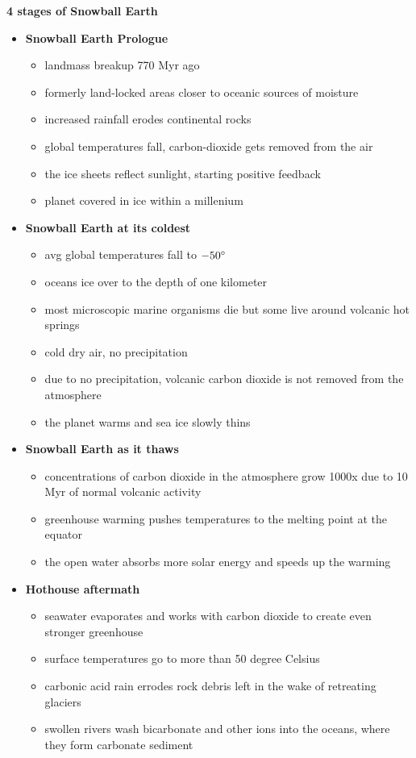 \textbf{4 stages of Snowball Earth}
\begin{itemize}
    \item \textbf{Snowball Earth Prologue}
    \begin{itemize}
    	\item landmass breakup 770 Myr ago
	\item formerly land-locked areas closer to oceanic sources of moisture
	\item increased rainfall erodes continental rocks
	\item global temperatures fall, carbon-dioxide gets removed from the
	air
	\item the ice sheets reflect sunlight, starting positive feedback
	\item planet covered in ice within a millenium
    \end{itemize}
    \item \textbf{Snowball Earth at its coldest}
    \begin{itemize}
    	\item avg global temperatures fall to $-50 \degree$
	\item oceans ice over to the depth of one kilometer
	\item most microscopic marine organisms die but some live around
	volcanic hot springs
	\item cold dry air, no precipitation
	\item due to no precipitation, volcanic carbon dioxide is not removed
	from the atmosphere
	\item the planet warms and sea ice slowly thins
    \end{itemize}
    \item \textbf{Snowball Earth as it thaws}
    \begin{itemize}
	\item concentrations of carbon dioxide in the atmosphere grow 1000x due
	to 10 Myr of normal volcanic activity
	\item greenhouse warming pushes temperatures to the melting point at
	the equator
	\item the open water absorbs more solar energy and speeds up the
	warming
    \end{itemize}
    \item \textbf{Hothouse aftermath}
    \begin{itemize}
	\item seawater evaporates and works with carbon dioxide to create even
	stronger greenhouse
	\item surface temperatures go to more than 50 degree Celsius
	\item carbonic acid rain errodes rock debris left in the wake of
	retreating glaciers
	\item swollen rivers wash bicarbonate and other ions into the oceans,
	where they form carbonate sediment
    \end{itemize}
\end{itemize}

